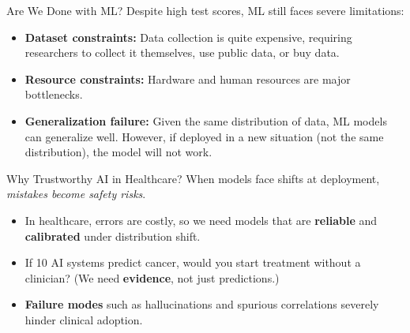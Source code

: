 \documentclass[aspectratio=169]{beamer}
\begin{document}
\begin{frame}{Are We Done with ML?}
    Despite high test scores, ML still faces severe limitations:
    \begin{itemize}
        \item \textbf{Dataset constraints:} Data collection is quite expensive, requiring researchers to collect it themselves, use public data, or buy data.
        \item \textbf{Resource constraints:} Hardware and human resources are major bottlenecks.
        \item \textbf{Generalization failure:} Given the same distribution of data, ML models can generalize well. However, if deployed in a new situation (not the same distribution), the model will not work.
    \end{itemize}

\end{frame}



\begin{frame}{Why Trustworthy AI in Healthcare?}
    When models face shifts at deployment, \emph{mistakes become safety risks}.
    \vspace{0.2cm}
    \begin{itemize}
        \item In healthcare, errors are costly, so we need models that are \textbf{reliable} and \textbf{calibrated} under distribution shift.
        \item If 10 AI systems predict cancer, would you start treatment without a clinician? (We need \textbf{evidence}, not just predictions.)
        \item \textbf{Failure modes} such as hallucinations and spurious correlations severely hinder clinical adoption.
    \end{itemize}
    \vspace{0.3cm}
    
\end{frame}
\end{document}
